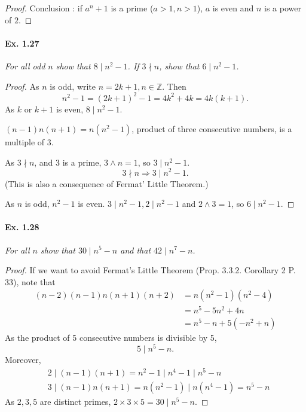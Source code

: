 \documentclass[11pt,a4paper]{article}
\newcommand{\Z}{\mathbb{Z}}
\begin{document}
{\begin{proof}
Conclusion : if $a^n+1$ is a prime ($a>1,n>1$), $a$ is even and $n$ is a power of $2$.
\end{proof}

\paragraph{Ex. 1.27} 

{\it For all odd $n$ show that $8\mid n^2 - 1$. If $3\nmid n$,
show that $6\mid n^2 - 1$.
}

\begin{proof}
As $n$ is odd, write $n=2k+1, n \in \Z$. Then
$$n^2 - 1 = (2k+1)^2-1 = 4k^2+4k = 4k(k+1).$$
As $k$ or $k+1$ is even, $8 \mid n^2 - 1$.

$(n-1)n(n+1) = n (n^2-1)$, product of three consecutive numbers, is a multiple of 3.

As $3 \nmid n$, and 3 is a prime, $3 \wedge n = 1$, so $3 \mid n^2-1$.
$$3 \nmid n \Rightarrow 3 \mid n^2 -1.$$
(This is also a consequence of Fermat' Little Theorem.)

As $n$ is odd, $n^2-1$ is even.
$3 \mid n^2-1, 2 \mid n^2-1$ and $2 \wedge 3 = 1$, so $6 \mid n^2-1$.
\end{proof}

\paragraph{Ex. 1.28}

{\it For all $n$ show that $30 \mid  n^5 - n$ and that $42\mid n^7 - n$.
}

\begin{proof}
If we want to avoid Fermat's Little Theorem (Prop. 3.3.2. Corollary 2 P. 33), note that
\begin{align*}
(n-2)(n-1)n(n+1)(n+2) &= n(n^2-1)(n^2-4)\\
&=n^5-5n^2+4n\\
&=n^5 - n +5 (-n^2+n)
\end{align*}
As the product of 5 consecutive numbers is divisible by 5,
$$5 \mid n^5 - n.$$
Moreover,
\begin{align*}
&2 \mid (n-1)(n+1) = n^2 -  1  \mid n^4 - 1 \mid n^5 -n\\
&3 \mid (n-1)n(n+1) = n(n^2 - 1) \mid n(n^4-1) = n^5 - n
\end{align*}
As $2,3,5$ are distinct primes, $2\times 3 \times 5 = 30 \mid n^5-n$.


\end{proof}}
\end{document}
